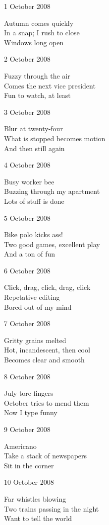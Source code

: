 \documentclass[12pt]{article}
\begin{document}
1 October 2008

Autumn comes quickly \\
In a snap; I rush to close \\
Windows long open

2 October 2008

Fuzzy through the air \\
Comes the next vice president \\
Fun to watch, at least

3 October 2008

Blur at twenty-four \\
What is stopped becomes motion \\
And then still again

\newpage

4 October 2008

Busy worker bee \\
Buzzing through my apartment \\
Lots of stuff is done

5 October 2008

Bike polo kicks ass! \\
Two good games, excellent play \\
And a ton of fun

6 October 2008

Click, drag, click, drag, click \\
Repetative editing \\
Bored out of my mind

7 October 2008

Gritty grains melted \\
Hot, incandescent, then cool \\
Becomes clear and smooth

8 October 2008

July tore fingers \\ 
October tries to mend them \\
Now I type funny

9 October 2008

Americano \\
Take a stack of newspapers \\
Sit in the corner

10 October 2008

Far whistles blowing \\
Two trains passing in the night \\
Want to tell the world

\newpage
\end{document}
